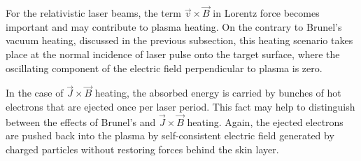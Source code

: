 For the relativistic laser beams, the term $ \vec{v} \times \vec{B} $ in Lorentz force becomes important and may contribute to plasma heating. On the contrary to Brunel's vacuum heating, discussed in the previous subsection, this heating scenario takes place at the normal incidence of laser pulse onto the target surface, where the oscillating component of the electric field perpendicular to plasma is zero.

In the case of $ \vec{J} \times \vec{B} $ heating, the absorbed energy is carried by bunches of hot electrons that are ejected once per laser period. This fact may help to distinguish between the effects of Brunel's and $ \vec{J} \times \vec{B} $ heating. Again, the ejected electrons are pushed back into the plasma by self-consistent electric field generated by charged particles without restoring forces behind the skin layer.